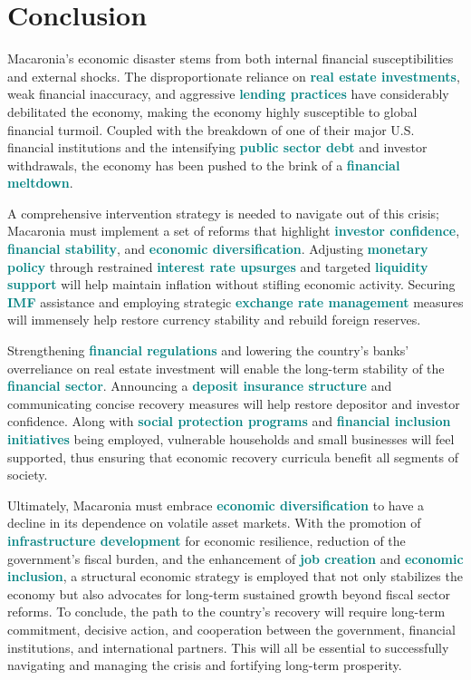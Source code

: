 \section*{Conclusion}

Macaronia’s economic disaster stems from both internal financial susceptibilities and external shocks. The disproportionate reliance on \textbf{\textcolor{teal}{real estate investments}}, weak financial inaccuracy, and aggressive \textbf{\textcolor{teal}{lending practices}} have considerably debilitated the economy, making the economy highly susceptible to global financial turmoil. Coupled with the breakdown of one of their major U.S. financial institutions and the intensifying \textbf{\textcolor{teal}{public sector debt}} and investor withdrawals, the economy has been pushed to the brink of a \textbf{\textcolor{teal}{financial meltdown}}.  

A comprehensive intervention strategy is needed to navigate out of this crisis; Macaronia must implement a set of reforms that highlight \textbf{\textcolor{teal}{investor confidence}}, \textbf{\textcolor{teal}{financial stability}}, and \textbf{\textcolor{teal}{economic diversification}}. Adjusting \textbf{\textcolor{teal}{monetary policy}} through restrained \textbf{\textcolor{teal}{interest rate upsurges}} and targeted \textbf{\textcolor{teal}{liquidity support}} will help maintain inflation without stifling economic activity. Securing \textbf{\textcolor{teal}{IMF}} assistance and employing strategic \textbf{\textcolor{teal}{exchange rate management}} measures will immensely help restore currency stability and rebuild foreign reserves. 

Strengthening \textbf{\textcolor{teal}{financial regulations}} and lowering the country’s banks’ overreliance on real estate investment will enable the long-term stability of the \textbf{\textcolor{teal}{financial sector}}. Announcing a \textbf{\textcolor{teal}{deposit insurance structure}} and communicating concise recovery measures will help restore depositor and investor confidence. Along with \textbf{\textcolor{teal}{social protection programs}} and \textbf{\textcolor{teal}{financial inclusion initiatives}} being employed, vulnerable households and small businesses will feel supported, thus ensuring that economic recovery curricula benefit all segments of society. 

Ultimately, Macaronia must embrace \textbf{\textcolor{teal}{economic diversification}} to have a decline in its dependence on volatile asset markets. With the promotion of \textbf{\textcolor{teal}{infrastructure development}} for economic resilience, reduction of the government’s fiscal burden, and the enhancement of \textbf{\textcolor{teal}{job creation}} and \textbf{\textcolor{teal}{economic inclusion}}, a structural economic strategy is employed that not only stabilizes the economy but also advocates for long-term sustained growth beyond fiscal sector reforms. To conclude, the path to the country’s recovery will require long-term commitment, decisive action, and cooperation between the government, financial institutions, and international partners. This will all be essential to successfully navigating and managing the crisis and fortifying long-term prosperity.
